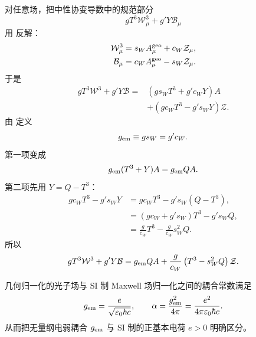 \begin{proposition}
对任意场，把中性协变导数中的规范部分
\begin{equation*}
 gT^3\mathcal W_\mu^3+g'Y\mathcal B_\mu
\end{equation*}
用  反解：
\begin{align*}
 \mathcal W^3_\mu&=s_WA_\mu^{\rm geo}+c_W\mathcal Z_\mu,\\
 \mathcal B_\mu&=c_WA_\mu^{\rm geo}-s_W\mathcal Z_\mu.
\end{align*}
于是
\begin{align*}
 gT^3\mathcal W^3+g'Y\mathcal B
 =&\left(gs_WT^3+g'c_WY\right)A\\
 &+\left(gc_WT^3-g's_WY\right)\mathcal Z.
\end{align*}
由  定义
\begin{equation}
 {g_{\rm em}\equiv gs_W=g'c_W.}
 \label{eq:gem-definition-dp11}
\end{equation}
第一项变成
\begin{equation*}
 g_{\rm em}(T^3+Y)A
 =g_{\rm em}QA.
\end{equation*}
第二项先用 $Y=Q-T^3$：
\begin{align*}
 gc_WT^3-g's_WY
 &=gc_WT^3-g's_W(Q-T^3),\\
 &=\left(gc_W+g's_W\right)T^3-g's_WQ,\\
 &=\frac g{c_W}T^3-\frac g{c_W}s_W^2Q.
\end{align*}
所以
\begin{equation}
 {
 gT^3\mathcal W^3+g'Y\mathcal B
 =g_{\rm em}QA
 +\frac g{c_W}\left(T^3-s_W^2Q\right)\mathcal Z.}
 \label{eq:neutral-current-generator-dp11}
\end{equation}

几何归一化的光子场与 SI 制 Maxwell 场归一化之间的耦合常数满足
\begin{equation}
 {
 g_{\rm em}=\frac{e}{\sqrt{\varepsilon_0\hbar c}},
 \qquad
 \alpha=\frac{g_{\rm em}^2}{4\pi}
 =\frac{e^2}{4\pi\varepsilon_0\hbar c}.}
 \label{eq:gem-si-charge-dp11}
\end{equation}
从而把无量纲电弱耦合 $g_{\rm em}$ 与 SI 制的正基本电荷 $e>0$ 明确区分。
\end{proposition}

